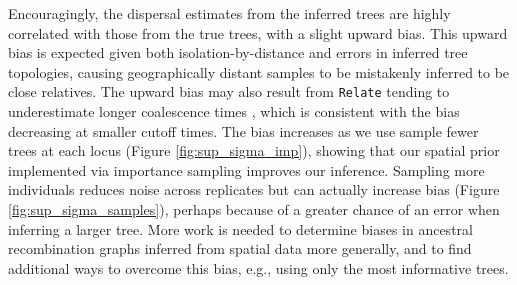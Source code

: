 \documentclass[12pt]{article}
\begin{document}
Encouragingly, the dispersal estimates from the inferred trees are highly correlated with those from the true trees, with a slight upward bias.
This upward bias is expected given both isolation-by-distance and errors in inferred tree topologies, causing geographically distant samples to be mistakenly inferred to be close relatives.
The upward bias may also result from \texttt{Relate} tending to underestimate longer coalescence times \citep{brandt2022evaluation}, which is consistent with the bias decreasing at smaller cutoff times.
The bias increases as we use sample fewer trees at each locus (Figure \ref{fig:sup_sigma_imp}), showing that our spatial prior implemented via importance sampling improves our inference.
Sampling more individuals reduces noise across replicates but can actually increase bias (Figure \ref{fig:sup_sigma_samples}), perhaps because of a greater chance of an error when inferring a larger tree.
More work is needed to determine biases in ancestral recombination graphs inferred from spatial data more generally, and to find additional ways to overcome this bias, e.g., using only the most informative trees.

\end{document}
